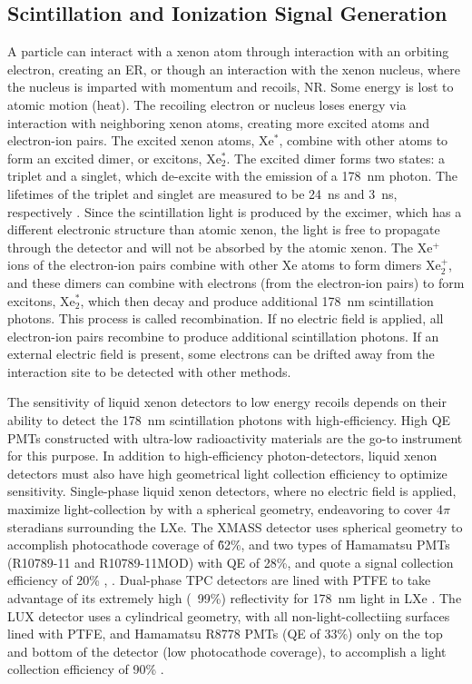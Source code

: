 \subsection{Scintillation and Ionization Signal Generation}
\label{sec:signal_generation}
A particle can interact with a xenon atom through interaction with an orbiting electron, creating an \ac{ER}, or though an interaction with the xenon nucleus, where the nucleus is imparted with momentum and recoils, \ac{NR}. Some energy is lost to atomic motion (heat). The recoiling electron or nucleus loses energy via interaction with neighboring xenon atoms, creating more excited atoms and electron-ion pairs. The excited xenon atoms, Xe$^{*}$, combine with other atoms to form an excited dimer, or excitons, Xe$_{2}^{*}$. The excited dimer forms two states: a triplet and a singlet, which de-excite with the emission of a 178~nm photon. The lifetimes of the triplet and singlet are measured to be 24~ns and 3~ns, respectively \cite{Mock2014}. Since the scintillation light is produced by the excimer, which has a different electronic structure than atomic xenon, the light is free to propagate through the detector and will not be absorbed by the atomic xenon. The Xe$^{+}$ ions of the electron-ion pairs combine with other Xe atoms to form dimers Xe$_{2}^{+}$, and these dimers can combine with electrons (from the electron-ion pairs) to form excitons, Xe$_{2}^{*}$, which then decay and produce additional 178~nm scintillation photons. This process is called recombination. If no electric field is applied, all electron-ion pairs recombine to produce additional scintillation photons. If an external electric field is present, some electrons can be drifted away from the interaction site to be detected with other methods. 

The sensitivity of liquid xenon detectors to low energy recoils depends on their ability to detect the 178~nm scintillation photons with high-efficiency. High \ac{QE} \ac{PMT}s constructed with ultra-low radioactivity materials are the go-to instrument for this purpose. In addition to high-efficiency photon-detectors, liquid xenon detectors must also have high geometrical light collection efficiency to optimize sensitivity. Single-phase liquid xenon detectors, where no electric field is applied, maximize light-collection by with a spherical geometry, endeavoring to cover 4$\pi$ steradians surrounding the \ac{LXe}. The XMASS detector uses spherical geometry to accomplish photocathode coverage of \~62\%, and two types of Hamamatsu \ac{PMT}s (R10789-11 and R10789-11MOD) with \ac{QE} of 28\%, and quote a signal collection efficiency of 20\% \cite{Abe2013}, \cite{XMASSCollaboration2018}. Dual-phase \ac{TPC} detectors are lined with \ac{PTFE} to take advantage of its extremely high (~99\%) reflectivity for 178~nm light in \ac{LXe} \cite{Neves2017}. The \ac{LUX} detector uses a cylindrical geometry, with all non-light-collectiing surfaces lined with \ac{PTFE}, and Hamamatsu R8778 \ac{PMT}s (\ac{QE} of 33\%) only on the top and bottom of the detector (low photocathode coverage), to accomplish a light collection efficiency of 90\% \cite{Faham2014a}.

